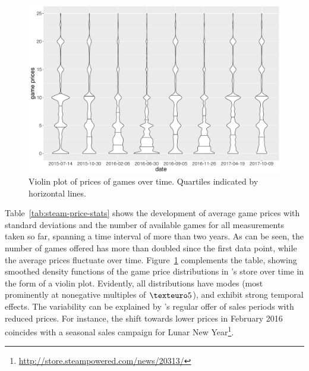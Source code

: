 \begin{figure}[!t]
	\centering
	\includegraphics[width=1.0\columnwidth]{images/steam-price-violins-over-time.pdf}
	\caption{Violin plot of prices of \steam games over time. Quartiles indicated by horizontal lines.}
\label{fig:steam-price-violins}
\end{figure}


Table~\ref{tab:steam-price-stats} shows the development of average
\steam game prices with standard deviations and the number of available
games for all \steam measurements taken so far, spanning a time interval
of more than two years. As can be seen, the number of games offered
has more than doubled since the first data point, while the average
prices fluctuate over time.
Figure~\ref{fig:steam-price-violins} complements the table, showing
smoothed density functions of the game price distributions in \steam's
store over time in the form of a violin plot.
Evidently, all distributions have modes (most prominently at nonegative
multiples of $\texteuro 5$), and exhibit strong temporal effects.
The variability can be explained by \steam's regular offer of sales
periods with reduced prices. For instance, the shift towards lower
prices in February 2016 coincides with a seasonal sales campaign
for Lunar New Year\footnote{\url{http://store.steampowered.com/news/20313/}}.


